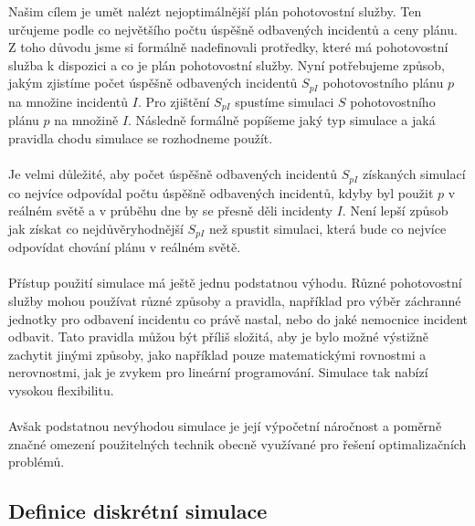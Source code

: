 Našim cílem je umět nalézt nejoptimálnější plán pohotovostní služby.
Ten určujeme podle co největšího počtu úspěšně odbavených incidentů a ceny plánu.
Z toho důvodu jsme si formálně nadefinovali protředky, které má pohotovostní služba k dispozici a co je plán pohotovostní služby.
Nyní potřebujeme způsob, jakým zjistíme počet úspěšně odbavených incidentů $S_{pI}$ pohotovostního plánu $p$ na množine incidentů $I$.
Pro zjištění $S_{pI}$ spustíme simulaci $S$ pohotovostního plánu $p$ na množině $I$.
Následně formálně popíšeme jaký typ simulace a jaká pravidla chodu simulace se rozhodneme použít. %
\\
\\
Je velmi důležité, aby počet úspěšně odbavených incidentů $S_{pI}$ získaných simulací co nejvíce odpovídal počtu úspěšně odbavených incidentů,
kdyby byl použit $p$ v reálném světě a v průběhu dne by se přesně děli incidenty $I$.
Není lepší způsob jak získat co nejdůvěryhodnější $S_{pI}$ než spustit simulaci, která bude co nejvíce odpovídat chování plánu v reálném světě.
\\
\\
Přístup použití simulace má ještě jednu podstatnou výhodu.
Různé pohotovostní služby mohou používat různé způsoby a pravidla, například pro výběr záchranné jednotky pro odbavení incidentu co právě nastal, nebo do jaké nemocnice incident odbavit.
Tato pravidla můžou být příliš složitá, aby je bylo možné výstižně zachytit jinými způsoby, jako například pouze matematickými rovnostmi a nerovnostmi, jak je zvykem pro lineární programování.
Simulace tak nabízí vysokou flexibilitu.
\\
\\
Avšak podstatnou nevýhodou simulace je její výpočetní náročnost a poměrně značné omezení použitelných technik obecně využívané pro řešení optimalizačních problémů. %

\subsection{Definice diskrétní simulace}

